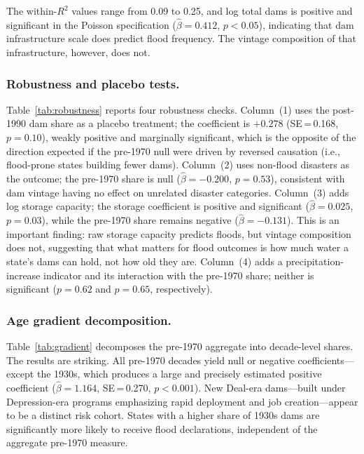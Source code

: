 \documentclass[12pt]{article}
\begin{document}
The within-$R^2$ values range from 0.09 to 0.25, and log total dams is positive and significant in the Poisson specification ($\hat{\beta} = 0.412$, $p < 0.05$), indicating that dam infrastructure scale does predict flood frequency. The vintage composition of that infrastructure, however, does not.



\subsubsection*{Robustness and placebo tests.}

Table~\ref{tab:robustness} reports four robustness checks. Column~(1) uses the post-1990 dam share as a placebo treatment; the coefficient is $+0.278$ (SE\,=\,0.168, $p = 0.10$), weakly positive and marginally significant, which is the opposite of the direction expected if the pre-1970 null were driven by reversed causation (i.e., flood-prone states building fewer dams). Column~(2) uses non-flood disasters as the outcome; the pre-1970 share is null ($\hat{\beta} = -0.200$, $p = 0.53$), consistent with dam vintage having no effect on unrelated disaster categories. Column~(3) adds log storage capacity; the storage coefficient is positive and significant ($\hat{\beta} = 0.025$, $p = 0.03$), while the pre-1970 share remains negative ($\hat{\beta} = -0.131$). This is an important finding: raw storage capacity predicts floods, but vintage composition does not, suggesting that what matters for flood outcomes is how much water a state's dams can hold, not how old they are. Column~(4) adds a precipitation-increase indicator and its interaction with the pre-1970 share; neither is significant ($p = 0.62$ and $p = 0.65$, respectively).



\subsubsection*{Age gradient decomposition.}

Table~\ref{tab:gradient} decomposes the pre-1970 aggregate into decade-level shares. The results are striking. All pre-1970 decades yield null or negative coefficients---except the 1930s, which produces a large and precisely estimated positive coefficient ($\hat{\beta} = 1.164$, SE\,=\,0.270, $p < 0.001$). New Deal-era dams---built under Depression-era programs emphasizing rapid deployment and job creation---appear to be a distinct risk cohort. States with a higher share of 1930s dams are significantly more likely to receive flood declarations, independent of the aggregate pre-1970 measure.
\end{document}
